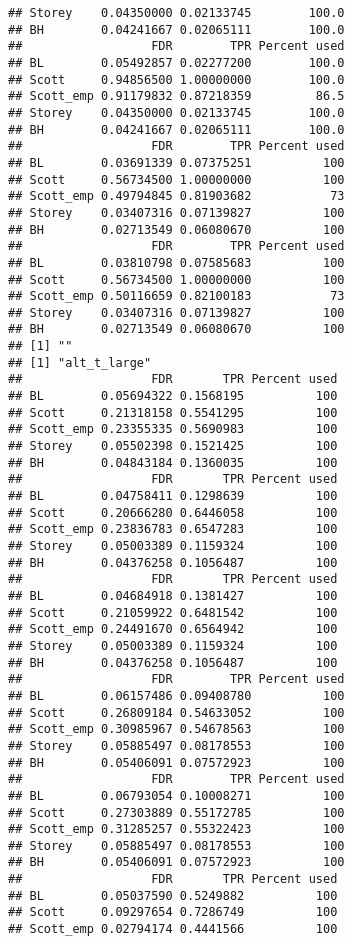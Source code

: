 \documentclass{article}\usepackage[]{graphicx}\usepackage[]{color}
\makeatletter
\newenvironment{kframe}{%
 \def\at@end@of@kframe{}%
 \ifinner\ifhmode%
  \def\at@end@of@kframe{\end{minipage}}%
  \begin{minipage}{\columnwidth}%
 \fi\fi%
 \def\FrameCommand##1{\hskip\@totalleftmargin \hskip-\fboxsep
 \colorbox{shadecolor}{##1}\hskip-\fboxsep
     \hskip-\linewidth \hskip-\@totalleftmargin \hskip\columnwidth}%
 \MakeFramed {\advance\hsize-\width
   \@totalleftmargin\z@ \linewidth\hsize
   \@setminipage}}%
 {\par\unskip\endMakeFramed%
 \at@end@of@kframe}
\newenvironment{knitrout}{}{} %
\makeatother
\begin{document}
\begin{knitrout}
\begin{kframe}
\begin{verbatim}
## Storey    0.04350000 0.02133745        100.0
## BH        0.04241667 0.02065111        100.0
##                  FDR        TPR Percent used
## BL        0.05492857 0.02277200        100.0
## Scott     0.94856500 1.00000000        100.0
## Scott_emp 0.91179832 0.87218359         86.5
## Storey    0.04350000 0.02133745        100.0
## BH        0.04241667 0.02065111        100.0
##                  FDR        TPR Percent used
## BL        0.03691339 0.07375251          100
## Scott     0.56734500 1.00000000          100
## Scott_emp 0.49794845 0.81903682           73
## Storey    0.03407316 0.07139827          100
## BH        0.02713549 0.06080670          100
##                  FDR        TPR Percent used
## BL        0.03810798 0.07585683          100
## Scott     0.56734500 1.00000000          100
## Scott_emp 0.50116659 0.82100183           73
## Storey    0.03407316 0.07139827          100
## BH        0.02713549 0.06080670          100
## [1] ""
## [1] "alt_t_large"
##                  FDR       TPR Percent used
## BL        0.05694322 0.1568195          100
## Scott     0.21318158 0.5541295          100
## Scott_emp 0.23355335 0.5690983          100
## Storey    0.05502398 0.1521425          100
## BH        0.04843184 0.1360035          100
##                  FDR       TPR Percent used
## BL        0.04758411 0.1298639          100
## Scott     0.20666280 0.6446058          100
## Scott_emp 0.23836783 0.6547283          100
## Storey    0.05003389 0.1159324          100
## BH        0.04376258 0.1056487          100
##                  FDR       TPR Percent used
## BL        0.04684918 0.1381427          100
## Scott     0.21059922 0.6481542          100
## Scott_emp 0.24491670 0.6564942          100
## Storey    0.05003389 0.1159324          100
## BH        0.04376258 0.1056487          100
##                  FDR        TPR Percent used
## BL        0.06157486 0.09408780          100
## Scott     0.26809184 0.54633052          100
## Scott_emp 0.30985967 0.54678563          100
## Storey    0.05885497 0.08178553          100
## BH        0.05406091 0.07572923          100
##                  FDR        TPR Percent used
## BL        0.06793054 0.10008271          100
## Scott     0.27303889 0.55172785          100
## Scott_emp 0.31285257 0.55322423          100
## Storey    0.05885497 0.08178553          100
## BH        0.05406091 0.07572923          100
##                  FDR       TPR Percent used
## BL        0.05037590 0.5249882          100
## Scott     0.09297654 0.7286749          100
## Scott_emp 0.02794174 0.4441566          100

\end{verbatim}
\end{kframe}
\end{knitrout}
\end{document}
